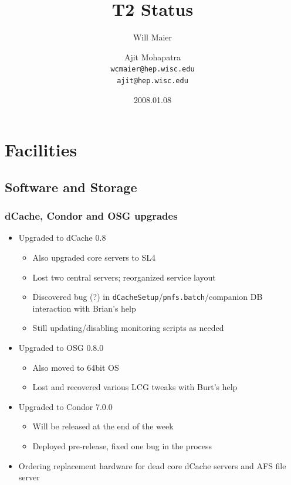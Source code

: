 \documentclass{beamer}
\title{T2 Status}
\author[Maier, Mohapatra]{
    Will Maier \and Ajit Mohapatra\\ 
    {\tt wcmaier@hep.wisc.edu}\\
    {\tt ajit@hep.wisc.edu}}
\institute[Wisconsin]{University of Wisconsin - High Energy Physics}
\date{2008.01.08}
\begin{document}
\begin{frame}
    \titlepage
\end{frame}


\section{Facilities}
\subsection{Software and Storage}
\begin{frame}
\frametitle{dCache, Condor and OSG upgrades}
\begin{itemize}
    \item Upgraded to dCache 0.8
    \begin{itemize}
        \item Also upgraded core servers to SL4
        \item Lost two central servers; reorganized service layout
        \item Discovered bug (?) in {\tt dCacheSetup}/{\tt pnfs.batch}/companion DB interaction with Brian's help
        \item Still updating/disabling monitoring scripts as needed
    \end{itemize}
    \item Upgraded to OSG 0.8.0
    \begin{itemize}
        \item Also moved to 64bit OS
        \item Lost and recovered various LCG tweaks with Burt's help
    \end{itemize}
    \item Upgraded to Condor 7.0.0
    \begin{itemize}
        \item Will be released at the end of the week
        \item Deployed pre-release, fixed one bug in the process
    \end{itemize}
    \item Ordering replacement hardware for dead core dCache servers and AFS file server
\end{itemize}
\end{frame}
\end{document}

